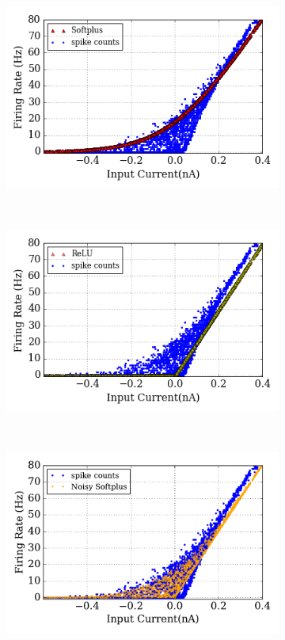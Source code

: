 			
	\begin{figure}[tbh!]
		\centering
		\begin{subfigure}[t]{0.6\textwidth}
			\includegraphics[width=\textwidth]{pics_iconip/6-5-1.png}
		\end{subfigure}\\
		\begin{subfigure}[t]{0.6\textwidth}
			\includegraphics[width=\textwidth]{pics_iconip/6-5-2.png}
		\end{subfigure}\\
		\begin{subfigure}[t]{0.6\textwidth}
			\includegraphics[width=\textwidth]{pics_iconip/6-5-3.pdf}

\end{subfigure}
\end{figure}
